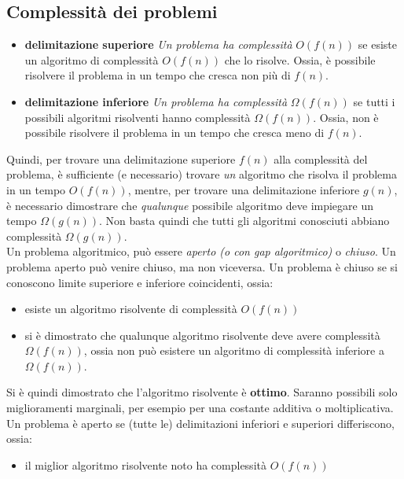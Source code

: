 \documentclass[12pt]{article}
\begin{document}
\subsection*{Complessità dei problemi}
\begin{itemize}
    \setlength\itemsep{0em}
    \item \textbf{delimitazione superiore} \textit{Un problema ha complessità} \(O(f(n))\) se esiste un algoritmo di complessità \(O(f(n))\) che lo risolve. Ossia, è possibile risolvere il problema in un tempo che cresca non più di \(f(n)\).
    \item \textbf{delimitazione inferiore} \textit{Un problema ha complessità} \(\Omega(f(n))\) se tutti i possibili algoritmi risolventi hanno complessità \(\Omega(f(n))\). Ossia, non è possibile risolvere il problema in un tempo che cresca meno di \(f(n)\).
\end{itemize}
Quindi, per trovare una delimitazione superiore \(f(n)\) alla complessità del problema, è sufficiente (e necessario) trovare \textit{un} algoritmo che risolva il problema in un tempo \(O(f(n))\), mentre, per trovare una delimitazione inferiore \(g(n)\), è necessario dimostrare che \textit{qualunque} possibile algoritmo deve impiegare un tempo \(\Omega(g(n))\). Non basta quindi che tutti gli algoritmi conosciuti abbiano complessità \(\Omega(g(n))\).\\
Un problema algoritmico, può essere \textit{aperto (o con gap algoritmico)} o \textit{chiuso}. Un problema aperto può venire chiuso, ma non viceversa. Un problema è chiuso se si conoscono limite superiore e inferiore coincidenti, ossia:
\begin{itemize}
    \setlength\itemsep{0em}
    \item esiste un algoritmo risolvente di complessità \(O(f(n))\)
    \item si è dimostrato che qualunque algoritmo risolvente deve avere complessità \(\Omega(f(n))\), ossia non può esistere un algoritmo di complessità inferiore a \(\Omega(f(n))\).
\end{itemize}
Si è quindi dimostrato che l'algoritmo risolvente è \textbf{ottimo}. Saranno possibili solo miglioramenti marginali, per esempio per una costante additiva o moltiplicativa.\\
Un problema è aperto se (tutte le) delimitazioni inferiori e superiori differiscono, ossia:
\begin{itemize}
    \setlength\itemsep{0em}
    \item il miglior algoritmo risolvente noto ha complessità \(O(f(n))\)
\end{itemize}
\end{document}
